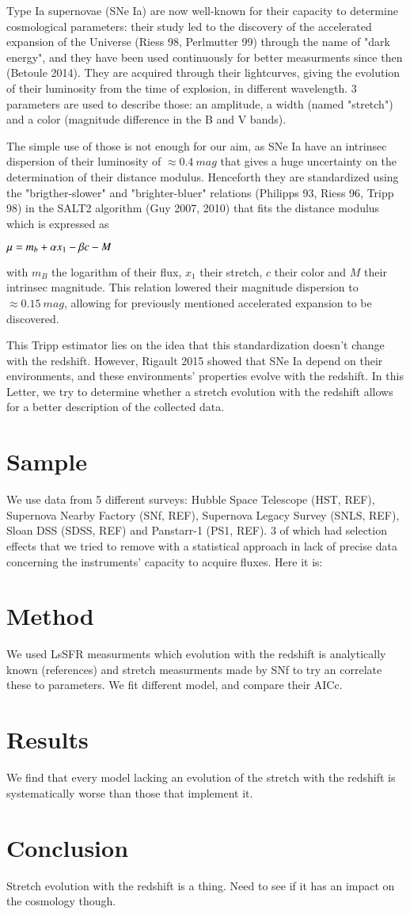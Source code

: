 \documentclass{aa}
\begin{document}
Type Ia supernovae (SNe Ia) are now well-known for their capacity to determine
cosmological parameters: their study led to the discovery of the accelerated
expansion of the Universe (Riess 98, Perlmutter 99) through the name of "dark
energy", and they have been used continuously for better measurments since then
(Betoule 2014). They are acquired through their lightcurves, giving the
evolution of their luminosity from the time of explosion, in different
wavelength. 3 parameters are used to describe those: an amplitude, a width
(named "stretch") and a color (magnitude difference in the B and V bands).

The simple use of those is not enough for our aim, as SNe Ia have an intrinsec
dispersion of their luminosity of $\approx \SI{0.4}{mag}$ that gives a huge
uncertainty on the determination of their distance modulus. Henceforth they are
standardized using the "brigther-slower" and "brighter-bluer" relations
(Philipps 93, Riess 96, Tripp 98) in the SALT2 algorithm (Guy 2007, 2010) that
fits the distance modulus which is expressed as
\begin{center}
    $ \displaystyle \mu = m_b + \alpha x_1 - \beta c - M$
\end{center}
with $m_B$ the logarithm of their flux, $x_1$ their stretch, $c$ their color and
$M$ their intrinsec magnitude. This relation lowered their magnitude dispersion
to $\approx \SI{0.15}{mag}$, allowing for previously mentioned accelerated
expansion to be discovered.

This Tripp estimator lies on the idea that this standardization doesn't change
with the redshift. However, Rigault 2015 showed that SNe Ia depend on their
environments, and these environments' properties evolve with the redshift. In
this Letter, we try to determine whether a stretch evolution with the redshift
allows for a better description of the collected data.

\section{Sample}
We use data from 5 different surveys: Hubble Space Telescope (HST, REF),
Supernova Nearby Factory (SNf, REF), Supernova Legacy Survey (SNLS, REF), Sloan
DSS (SDSS, REF) and Panstarr-1 (PS1, REF). 3 of which had selection effects that
we tried to remove with a statistical approach in lack of precise data
concerning the instruments' capacity to acquire fluxes. Here it is:

\section{Method}
We used LsSFR measurments which evolution with the redshift is analytically
known (references) and stretch measurments made by SNf to try an correlate these
to parameters. We fit different model, and compare their AICc.

\section{Results}
We find that every model lacking an evolution of the stretch with the redshift
is systematically worse than those that implement it.

\section{Conclusion}
Stretch evolution with the redshift is a thing. Need to see if it has an impact
on the cosmology though.
\end{document}
